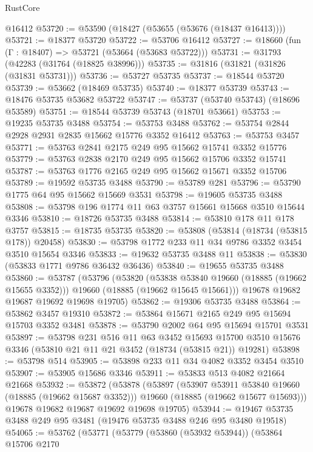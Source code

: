 \begin{lexlean}{RustCore}
\begin{coremodule}
    @16412
@53720 := @53590 (@18427 (@53655 (@53676 (@18437 @16413))))
@53721 := @18377 @53720
@53722 := @53706 @16412
@53727 := @18660 (fun (Γ : @18407) => @53721 (@53664 (@53683 @53722)))
@53731 := @31793 (@42283 (@31764 (@18825 @38996)))
@53735 := @31816 (@31821 (@31826 (@31831 @53731)))
@53736 := @53727 @53735
@53737 := @18544 @53720
@53739 := @53662 (@18469 @53735)
@53740 := @18377 @53739
@53743 := @18476 @53735 @53682 @53722
@53747 := @53737 (@53740 @53743) (@18696 @53589)
@53751 := @18544 @53739 @53743 (@18701 @53661)
@53753 := @19235 @53735 @3488
@53754 := @53753 @3488
@53762 := @53754 @2844 @2928 @2931 @2835 @15662 @15776 @3352 @16412
@53763 := @53753 @3457
@53771 := @53763 @2841 @2175 @249 @95 @15662 @15741 @3352 @15776
@53779 := @53763 @2838 @2170 @249 @95 @15662 @15706 @3352 @15741
@53787 := @53763 @1776 @2165 @249 @95 @15662 @15671 @3352 @15706
@53789 := @19592 @53735 @3488
@53790 := @53789 @281
@53796 := @53790 @1775 @64 @95 @15662 @15669 @3531
@53798 := @19605 @53735 @3488
@53808 := @53798 @196 @1774 @11 @63 @3757 @15661 @15668 @3510 @15644 @3346
@53810 := @18726 @53735 @3488
@53814 := @53810 @178 @11 @178 @3757
@53815 := @18735 @53735
@53820 := @53808 (@53814 (@18734 (@53815 @178)) @20458)
@53830 := @53798 @1772 @233 @11 @34 @9786 @3352 @3454 @3510 @15654 @3346
@53833 := @19632 @53735 @3488 @11
@53838 := @53830 (@53833 @1771 @9786 @36432 @36436)
@53840 := @19655 @53735 @3488
@53860 := @53787
    (@53796
      (@53820
        (@53838 @53840 @19660 (@18885 (@19662 @15655 @3352)))
        @19660
        (@18885 (@19662 @15645 @15661)))
      @19678
      @19682
      @19687
      @19692
      @19698
      @19705)
@53862 := @19306 @53735 @3488
@53864 := @53862 @3457 @19310
@53872 := @53864 @15671 @2165 @249 @95 @15694 @15703 @3352 @3481
@53878 := @53790 @2002 @64 @95 @15694 @15701 @3531
@53897 := @53798
    @231
    @516
    @11
    @63
    @3452
    @15693
    @15700
    @3510
    @15676
    @3346
    (@53810 @21 @11 @21 @3452 (@18734 (@53815 @21)) @19281)
@53898 := @53798 @514
@53905 := @53898 @233 @11 @34 @4082 @3352 @3454 @3510
@53907 := @53905 @15686 @3346
@53911 := @53833 @513 @4082 @21664 @21668
@53932 := @53872
    (@53878
      (@53897
        (@53907 @53911 @53840 @19660 (@18885 (@19662 @15687 @3352)))
        @19660
        (@18885 (@19662 @15677 @15693)))
      @19678
      @19682
      @19687
      @19692
      @19698
      @19705)
@53944 := @19467 @53735 @3488 @249 @95 @3481 (@19476 @53735 @3488 @246 @95 @3480 @19518)
@54065 := @53762
    (@53771
      (@53779
        (@53860 (@53932 @53944))
        (@53864
          @15706
          @2170

\end{coremodule}
\end{lexlean}
